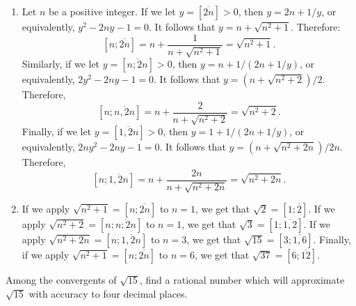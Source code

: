 \begin{solution}
    \begin{enumerate}
        \item Let $n$ be a positive integer. If we let $y = [\overline{2n}] > 0$, then $y = 2n + 1/y$, or equivalently, $y^2 - 2ny - 1 = 0$. It follows that $y = n + \sqrt{n^2 + 1}$. Therefore:
        $$[n; \overline{2n}] = n + \frac{1}{n + \sqrt{n^2 + 1}} = \sqrt{n^2 + 1}.$$
        Similarly, if we let $y = [\overline{n; 2n}] > 0$, then $y = n + 1/(2n + 1/y)$, or equivalently, $2y^2 - 2ny - 1 = 0$. It follows that $y = (n + \sqrt{n^2 + 2})/2$. Therefore, 
        $$[n; \overline{n, 2n}] = n + \frac{2}{n + \sqrt{n^2 + 2}} = \sqrt{n^2 + 2}.$$
        Finally, if we let $y = [\overline{1, 2n}] > 0$, then $y = 1 + 1/(2n + 1/y)$, or equivalently, $2ny^2 - 2ny - 1 = 0$. It follows that $y = (n+ \sqrt{n^2 + 2n})/2n$. Therefore, 
        $$[n; \overline{1, 2n}] = n + \frac{2n}{n +\sqrt{n^2 + 2n}} = \sqrt{n^2 + 2n}.$$
        \item If we apply $\sqrt{n^2 + 1} = [n; \overline{2n}]$ to $n = 1$, we get that $\sqrt{2} = [1; \overline{2}]$. If we apply $\sqrt{n^2 + 2} = [n; \overline{n; 2n}]$ to $n = 1$, we get that $\sqrt{3} = [1; \overline{1, 2}]$. If we apply $\sqrt{n^2 + 2n} = [n; \overline{1, 2n}]$ to $n = 3$, we get that $\sqrt{15} = [3; \overline{1, 6}]$. Finally, if we apply $\sqrt{n^2 + 1} = [n; \overline{2n}]$ to $n = 6$, we get that $\sqrt{37} = [6; \overline{12}]$. \\
    \end{enumerate}
\end{solution}

\begin{exercise}
    Among the convergents of $\sqrt{15}$, find a rational number which will approximate $\sqrt{15}$ with accuracy to four decimal places. \\
\end{exercise}


